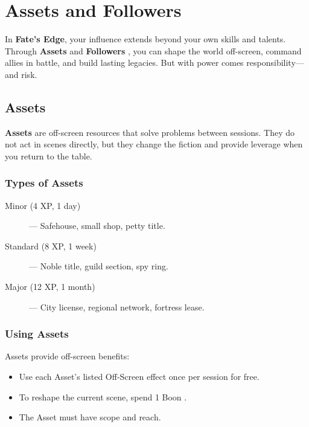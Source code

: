 
\chapter{Assets and Followers}
\label{ch:assets-followers}

In \textbf{Fate's Edge}, your influence extends beyond your own skills and talents. Through \textbf{Assets}  and \textbf{Followers} , you can shape the world off-screen, command allies in battle, and build lasting legacies. But with power comes responsibility—and risk.

\section{Assets}

\textbf{Assets} are off-screen resources that solve problems between sessions. They do not act in scenes directly, but they change the fiction and provide leverage when you return to the table.

\subsection*{Types of Assets}

\begin{description}
  \item[Minor (4 XP, 1 day)]  — Safehouse, small shop, petty title.
  \item[Standard (8 XP, 1 week)]  — Noble title, guild section, spy ring.
  \item[Major (12 XP, 1 month)]  — City license, regional network, fortress lease.
\end{description}

\subsection*{Using Assets}

Assets provide off-screen benefits:

\begin{itemize}
  \item Use each Asset's listed Off-Screen effect once per session for free.
  \item To reshape the current scene, spend 1 Boon .
  \item The Asset must have scope and reach.
\end{itemize}

